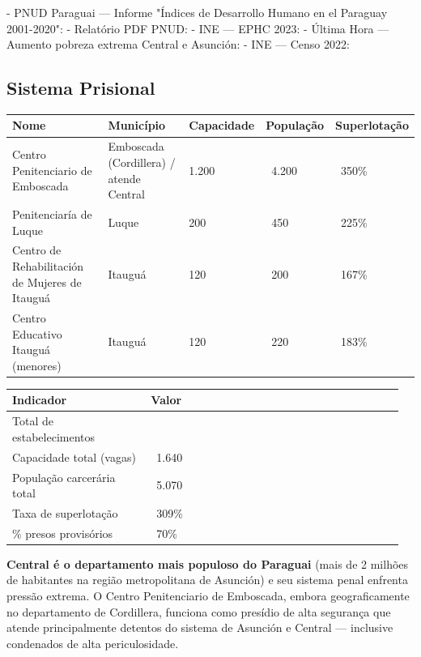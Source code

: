 - PNUD Paraguai --- Informe "Índices de Desarrollo Humano en el Paraguay 2001-2020": 
- Relatório PDF PNUD: 
- INE --- EPHC 2023: 
- Última Hora --- Aumento pobreza extrema Central e Asunción: 
- INE --- Censo 2022: 


\subsection{Sistema Prisional}



{\small
\setlength{\tabcolsep}{3pt}
\renewcommand{\arraystretch}{1.12}
{\small
\begin{tabularx}{\linewidth}{lXXXX}
\toprule
Nome & Município & Capacidade & População & Superlotação \\
\midrule
Centro Penitenciario de Emboscada & Emboscada (Cordillera) / atende Central & 1.200 & ~4.200 & ~350\% \\
Penitenciaría de Luque & Luque & 200 & ~450 & ~225\% \\
Centro de Rehabilitación de Mujeres de Itauguá & Itauguá & 120 & ~200 & ~167\% \\
Centro Educativo Itauguá (menores) & Itauguá & 120 & ~220 & ~183\% \\
\bottomrule
\end{tabularx}
}
}


{\small
\setlength{\tabcolsep}{3pt}
\renewcommand{\arraystretch}{1.12}
\begin{tabularx}{\linewidth}{>{\raggedright\arraybackslash}p{0.34\linewidth} >{\raggedright\arraybackslash}p{0.62\linewidth}}
\toprule
Indicador & Valor \\
\midrule
Total de estabelecimentos & 4 \\
Capacidade total (vagas) & ~1.640 \\
População carcerária total & ~5.070 \\
Taxa de superlotação & ~309\% \\
\% presos provisórios & ~70\% \\
\bottomrule
\end{tabularx}
}


\textbf{Central é o departamento mais populoso do Paraguai} (mais de 2 milhões de habitantes na região metropolitana de Asunción) e seu sistema penal enfrenta pressão extrema. O Centro Penitenciario de Emboscada, embora geograficamente no departamento de Cordillera, funciona como presídio de alta segurança que atende principalmente detentos do sistema de Asunción e Central --- inclusive condenados de alta periculosidade.

